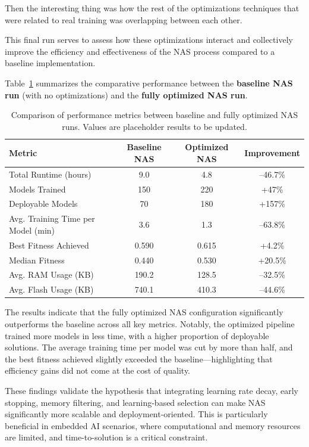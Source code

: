 \clearpage

Then the interesting thing was how the rest of the optimizations techniques that were related to real training was overlapping between each other.







This final run serves to assess how these optimizations interact and collectively improve the efficiency and effectiveness of the NAS process compared to a baseline implementation.

\vspace{0.5em}
\noindent Table~\ref{tab:final_combined_results} summarizes the comparative performance between the \textbf{baseline NAS run} (with no optimizations) and the \textbf{fully optimized NAS run}.

\begin{table}[ht]
\centering
\begin{tabular}{|l|c|c|c|}
\hline
\textbf{Metric} & \textbf{Baseline NAS} & \textbf{Optimized NAS} & \textbf{Improvement} \\
\hline
Total Runtime (hours) & 9.0 & 4.8 & –46.7\% \\
Models Trained & 150 & 220 & +47\% \\
Deployable Models & 70 & 180 & +157\% \\
Avg. Training Time per Model (min) & 3.6 & 1.3 & –63.8\% \\
Best Fitness Achieved & 0.590 & 0.615 & +4.2\% \\
Median Fitness & 0.440 & 0.530 & +20.5\% \\
Avg. RAM Usage (KB) & 190.2 & 128.5 & –32.5\% \\
Avg. Flash Usage (KB) & 740.1 & 410.3 & –44.6\% \\
\hline
\end{tabular}
\caption{Comparison of performance metrics between baseline and fully optimized NAS runs. Values are placeholder results to be updated.}
\label{tab:final_combined_results}
\end{table}

\noindent
The results indicate that the fully optimized NAS configuration significantly outperforms the baseline across all key metrics. Notably, the optimized pipeline trained more models in less time, with a higher proportion of deployable solutions. The average training time per model was cut by more than half, and the best fitness achieved slightly exceeded the baseline—highlighting that efficiency gains did not come at the cost of quality.

These findings validate the hypothesis that integrating learning rate decay, early stopping, memory filtering, and learning-based selection can make NAS significantly more scalable and deployment-oriented. This is particularly beneficial in embedded AI scenarios, where computational and memory resources are limited, and time-to-solution is a critical constraint.

\clearpage
